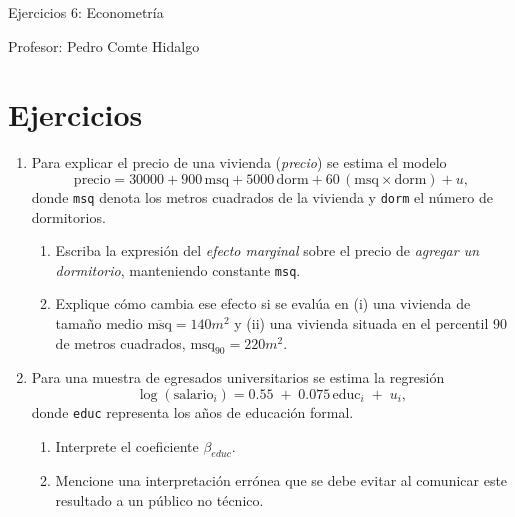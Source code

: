 \documentclass[10pt,a4paper]{article}
\begin{document}
\vspace{5cm}

\begin{center}
    {\Large  Ejercicios 6: Econometría }

Profesor:    Pedro Comte Hidalgo
\end{center}



\section{Ejercicios}
\begin{enumerate}

\item Para explicar el precio de una vivienda (\emph{precio}) se estima el modelo
        \[
          \text{precio}
          = 30000
          + 900\,\text{msq}
          + 5000\,\text{dorm}
          + 60\,(\text{msq}\times\text{dorm})
          + u ,
        \]
        donde \texttt{msq} denota los metros cuadrados de la vivienda y
        \texttt{dorm} el número de dormitorios.

        \begin{enumerate}[label=\alph*)]
          \item Escriba la expresión del \emph{efecto marginal} sobre el precio de
                \emph{agregar un dormitorio}, manteniendo constante \texttt{msq}.
          \item Explique cómo cambia ese efecto si se evalúa en (i) una vivienda de
                tamaño medio $\overline{\text{msq}}=140m^2$ y (ii) una vivienda situada
                en el percentil 90 de metros cuadrados, $\text{msq}_{90}=220m^2$.
        \end{enumerate}

        


 \item Para una muestra de egresados universitarios se estima la regresión
        \[
          \log(\text{salario}_i)
          = 0.55 \;+\; 0.075\,\text{educ}_i \;+\; u_i ,
        \]
        donde \texttt{educ} representa los años de educación formal.

        \begin{enumerate}[label=\alph*)]
          \item Interprete el coeficiente $\beta_{educ}$.
          \item Mencione una interpretación errónea que se debe evitar al
                comunicar este resultado a un público no técnico.
        \end{enumerate}


\end{enumerate}
\end{document}
